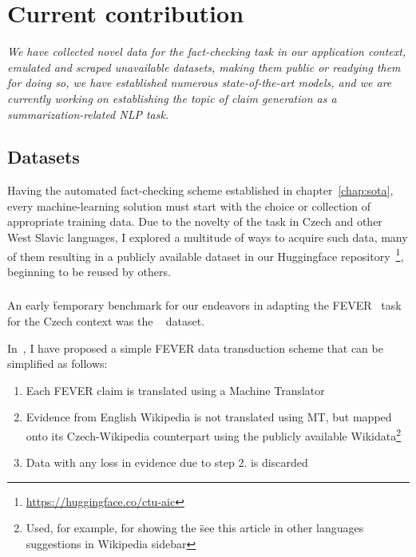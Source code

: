 
\chapter{Current contribution}
\label{chap:contribution}

\textit{We have collected novel data for the fact-checking task in our application context, emulated and scraped unavailable datasets, making them public or readying them for doing so, we have established numerous state-of-the-art models, and we are currently working on establishing the topic of claim generation as a summarization-related NLP task.}

\section{Datasets}
Having the automated fact-checking scheme established in chapter~\ref{chap:sota}, every machine-learning solution must start with the choice or collection of appropriate training data.
Due to the novelty of the task in Czech and other West Slavic languages, I explored a multitude of ways to acquire such data, many of them resulting in a publicly available dataset in our Huggingface repository~\footnote{\url{https://huggingface.co/ctu-aic}}, beginning to be reused by others. 

\subsection{\FCZ}\label{sec:fcz}
An early \"{temporary benchmark} for our endeavors in adapting the FEVER~\cite{fever} task for the Czech context was the \FCZ~\cite{lrev} dataset.

In~\cite{diplomka}, I have proposed a simple FEVER data transduction scheme that can be simplified as follows:

\begin{enumerate}
    \item Each FEVER claim is translated using a Machine Translator
    \item Evidence from English Wikipedia is not translated using MT, but mapped onto its Czech-Wikipedia counterpart using the publicly available Wikidata\footnote{Used, for example, for showing the \"{see this article in other languages} suggestions in Wikipedia sidebar}
    \item Data with any loss in evidence due to step 2. is discarded
\end{enumerate}

